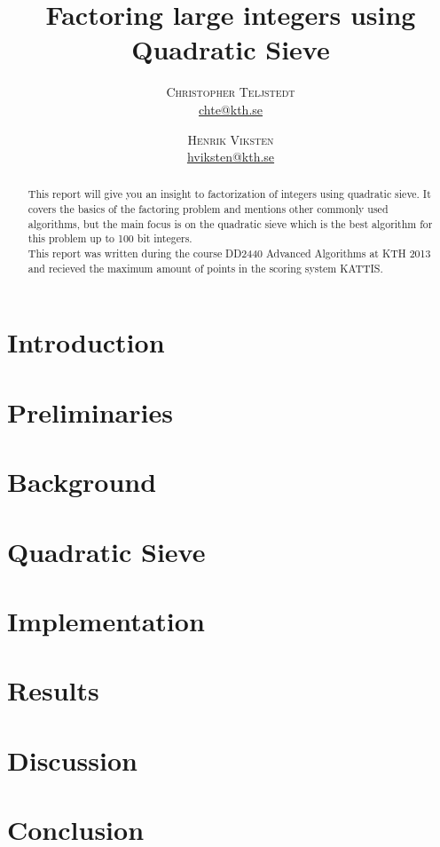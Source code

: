 \documentclass[twoside,11pt,english]{article}
\title{\vspace{-15mm}%
	\fontsize{24pt}{10pt}\selectfont
	\textbf{Factoring large integers using Quadratic Sieve}
	}
\author{%
	\large
	\textsc{Christopher Teljstedt} \\[2mm]
	\normalsize	\href{mailto:chte@kth.se}{chte@kth.se} 
	\and
	\textsc{Henrik Viksten} \\[2mm]
	\normalsize	\href{mailto:hviksten@kth.se}{hviksten@kth.se}
	}
\begin{document}
\maketitle
\thispagestyle{fancy}
\begin{abstract}

\noindent This report will give you an insight to factorization of integers using quadratic sieve. It covers the basics of the factoring problem and mentions other commonly used algorithms, but the main focus is on the quadratic sieve which is the best algorithm for this problem up to 100 bit integers. \\
This report was written during the course DD2440 Advanced Algorithms at KTH 2013 and recieved the maximum amount of points in the scoring system KATTIS.

\end{abstract}
\newpage

\tableofcontents
\newpage
	

\begin{multicols}{2}
\section{Introduction}

\section{Preliminaries}

\section{Background}

\section{Quadratic Sieve}

\section{Implementation}

\section{Results}

\section{Discussion}

\section{Conclusion}


\newpage


\end{multicols}
\end{document}
